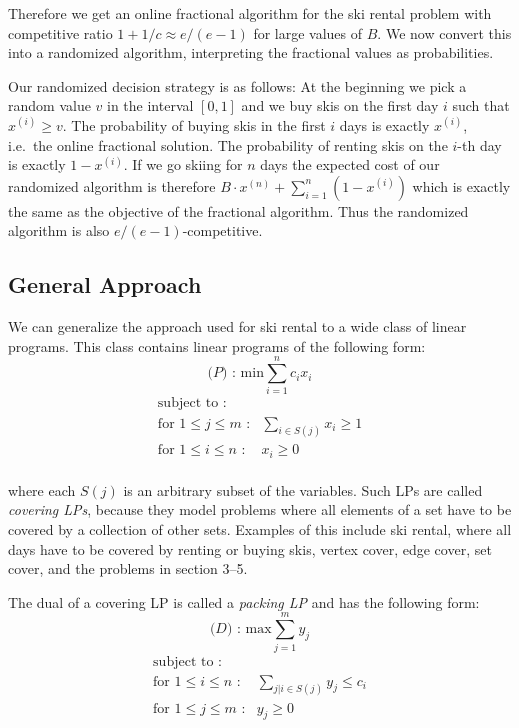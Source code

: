 Therefore we get an online fractional algorithm for the ski rental problem with competitive ratio $1+1/c \approx e/(e-1)$ for large values of $B$.
We now convert this into a randomized algorithm, interpreting the fractional values as probabilities.

Our randomized decision strategy is as follows: At the beginning we pick a random value $v$ in the interval $[0,1]$ and we buy skis on the first day $i$ such that $x^{(i)} \ge v$.
The probability of buying skis in the first $i$ days is exactly $x^{(i)}$, i.e.\ the online fractional solution. The probability of renting skis on the $i$-th day is exactly $1-x^{(i)}$.
If we go skiing for $n$ days the expected cost of our randomized algorithm is therefore $B \cdot  x^{(n)} + \sum_{i=1}^n(1-x^{(i)})$ which is exactly the same as the objective of the fractional algorithm.
Thus the randomized algorithm is also $e/(e-1)$-competitive.

\subsection{General Approach}
\label{section:general_approach}
We can generalize the approach used for ski rental to a wide class of linear programs.
This class contains linear programs of the following form:
\[
\textrm{($P$) : min}  \sum_{i=1}^n c_i x_i
\]
\[
	\begin{array}{lr}
	\textrm{subject to :} & \\
	\textrm{for $1 \le j \le m$} \textrm{ :} & \sum_{i \in S(j)} x_i  \ge 1  \\
	\textrm{for $1 \le i \le n$} \textrm{ :} & x_i  \ge 0  \\

	\end{array}
\]

where each $S(j)$ is an arbitrary subset of the variables.
Such LPs are called \emph{covering LPs}, because they model problems where all elements of a set have to be covered by a collection of other sets.
Examples of this include ski rental, where all days have to be covered by renting or buying skis, vertex cover, edge cover, set cover, and the problems in section 3--5.

The dual of a covering LP is called a \emph{packing LP} and has the following form:
\[
\textrm{($D$) : max}  \sum_{j=1}^m y_j
\]
\[
	\begin{array}{lr}
	\textrm{subject to :} & \\
	\textrm{for $1 \le i \le n$} \textrm{ :} & \sum_{j | i \in S(j)} y_j  \le c_i  \\
	\textrm{for $1 \le j \le m$} \textrm{ :} & y_j \ge 0  \\

	\end{array}
\]

